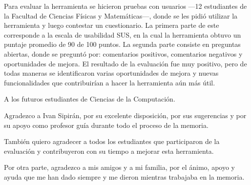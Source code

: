 \documentclass{umemoria}
\begin{document}
\begin{resumen}
Para evaluar la herramienta se hicieron pruebas con usuarios ---12 estudiantes de la Facultad de Ciencias Físicas y Matemáticas---, donde se les pidió utilizar la herramienta y luego contestar un cuestionario. La primera parte de este corresponde a la escala de usabilidad SUS, en la cual la herramienta obtuvo un puntaje promedio de 90 de 100 puntos. La segunda parte consiste en preguntas abiertas, donde se preguntó por: comentarios positivos, comentarios negativos y oportunidades de mejora. El resultado de la evaluación fue muy positivo, pero de todas maneras se identificaron varias oportunidades de mejora y nuevas funcionalidades que contribuirían a hacer la herramienta aún más útil.
\end{resumen}


\begin{dedicatoria}
A los futuros estudiantes de Ciencias de la Computación.
\end{dedicatoria}

\begin{thanks}

Agradezco a Ivan Sipirán, por su excelente disposición, por sus sugerencias y por su apoyo como profesor guía durante todo el proceso de la memoria.

También quiero agradecer a todos los estudiantes que participaron de la evaluación y contribuyeron con su tiempo a mejorar esta herramienta.

Por otra parte, agradezco a mis amigos y a mi familia, por el ánimo, apoyo y ayuda que me han dado siempre y me dieron mientras trabajaba en la memoria.



\end{thanks}

\tableofcontents
\listoftables %
\listoffigures %

\mainmatter
\end{document}
